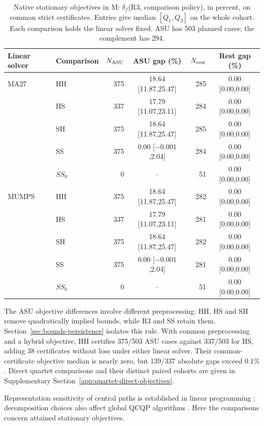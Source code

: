 \documentclass[pdflatex,sn-mathphys-num]{sn-jnl}
\theoremstyle{thmstyleone}
\theoremstyle{thmstylethree}
\newcounter{algorithm}
\begin{document}
\begin{table}[t]
\centering\footnotesize
\setlength{\tabcolsep}{5pt}
\caption{Native stationary objectives in M: $\delta_f$(R3, comparison
policy), in percent, on common strict certificates. Entries give median
$[Q_1,Q_3]$ on the whole cohort. Each comparison holds the linear solver
fixed. ASU has 503 planned cases; the complement has 294.}
\label{tab:objective-core}
\begin{tabular}{@{}llrcr c@{}}
\toprule
Linear solver & Comparison & $N_{\rm ASU}$ & ASU gap (\%) & $N_{\rm rest}$ & Rest gap (\%)\\
\midrule
MA27 & HH &375&18.64 [11.87,25.47]&285&0.00 [0.00,0.00]\\
 & HS &337&17.79 [11.07,23.11]&284&0.00 [0.00,0.00]\\
 & SH &375&18.64 [11.87,25.47]&285&0.00 [0.00,0.00]\\
 & SS &375&0.00 [$-0.001$,2.04]&284&0.00 [0.00,0.00]\\
 & $SS_0$ &0&--&51&0.00 [0.00,0.00]\\
\addlinespace
MUMPS & HH &375&18.64 [11.87,25.47]&282&0.00 [0.00,0.00]\\
 & HS &337&17.79 [11.07,23.11]&281&0.00 [0.00,0.00]\\
 & SH &375&18.64 [11.87,25.47]&282&0.00 [0.00,0.00]\\
 & SS &375&0.00 [$-0.001$,2.04]&281&0.00 [0.00,0.00]\\
 & $SS_0$ &0&--&51&0.00 [0.00,0.00]\\
\bottomrule
\end{tabular}
\end{table}

The ASU objective differences involve different preprocessing: HH, HS and SH
remove quadratically implied bounds, while R3 and SS retain them.
Section~\ref{sec:bounds-persistence} isolates this rule. With common
preprocessing and a hybrid objective, HH certifies 375/503 ASU cases
against 337/503 for HS, adding 38 certificates without loss under either
linear solver. Their common-certificate objective median is nearly zero,
but 139/337 absolute gaps exceed $0.1\%$. Direct quartet comparisons and
their distinct paired cohorts are given in Supplementary
Section~\ref{app:quartet-direct-objectives}.

Representation sensitivity of central paths is established in linear
programming \citep{DezaNematollahiTerlaky2008,NematollahiTerlaky2008Touching};
decomposition choices also affect global QCQP algorithms
\citep{VanVoorhisAlKhayyal2003,ZhengSunLi2011}. Here the comparisons concern
attained stationary objectives.
\end{document}
